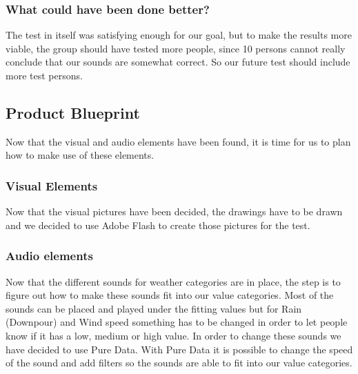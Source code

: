 
\subsubsection*{What could have been done better?} %
\label{ssub:test_3_what_could_have_been_done_better_}

The test in itself was satisfying enough for our goal, but to make the results more viable, the group should have tested more people, since 10 persons cannot really conclude that our sounds are somewhat correct. 
So our future test should include more test persons.





\subsection{Product Blueprint} %
\label{sub:product_blueprint}

Now that the visual and audio elements have been found, it is time for us to plan how to make use of these elements.

\subsubsection{Visual Elements} %
\label{ssub:visual_elements}

Now that the visual pictures have been decided, the drawings have to be drawn and we decided to use Adobe Flash to create those pictures for the test.



\subsubsection{Audio elements} %
\label{ssub:audio_elements}

Now that the different sounds for weather categories are in place, the step is to figure out how to make these sounds fit into our value categories.  
Most of the sounds can be placed and played under the fitting values but for Rain (Downpour) and Wind speed something has to be changed in order to let people know if it has a low, medium or high value. 
In order to change these sounds we have decided to use Pure Data. 
With Pure Data it is possible to change the speed of the sound and add filters so the sounds are able to fit into our value categories.  


